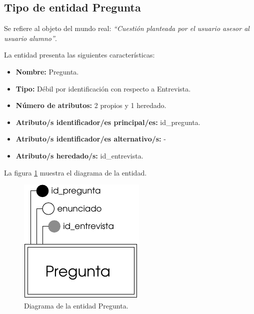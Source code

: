 \subsection{Tipo de entidad Pregunta}

   \begin{description}

   \item[Definición] Se refiere al objeto del mundo real: \emph{``Cuestión planteada por el usuario asesor al usuario alumno''}.

   \item[Características] La entidad presenta las siguientes características:
      \begin{itemize}
         \item \textbf{Nombre:} Pregunta.
         \item \textbf{Tipo:} Débil por identificación con respecto a Entrevista.
         \item \textbf{Número de atributos:} 2 propios y 1 heredado.
         \item \textbf{Atributo/s identificador/es principal/es:} id\_pregunta.
         \item \textbf{Atributo/s identificador/es alternativo/s:} -
         \item \textbf{Atributo/s heredado/s:} id\_entrevista.
      \end{itemize}

   \item[Diagrama] La figura \ref{diagramaPregunta} muestra el diagrama de la entidad.
   \item \begin{figure}[!ht]
            \begin{center}
            \includegraphics[]{07.Modelo_Entidad-Interrelacion/7.2.Analisis_Entidades/diagramas/pregunta.pdf}
            \caption{Diagrama de la entidad Pregunta.}
            \label{diagramaPregunta}
            \end{center}
         \end{figure}


\end{description}
